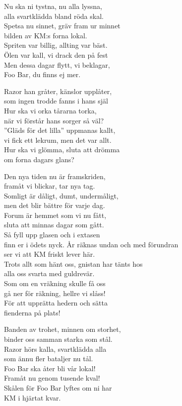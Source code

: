 \songtext{} 
Nu ska ni tystna, nu alla lyssna,\\
alla svartklädda bland röda skal.\\
Spetsa nu sinnet, gräv fram ur minnet\\
bilden av KM:s forna lokal.\\
Spriten var billig, allting var bäst.\\
Ölen var kall, vi drack den på fest\\
Men dessa dagar flytt, vi beklagar,\\
Foo Bar, du finns ej mer.

Razor han gråter, känslor upplåter,\\
som ingen trodde fanns i hans själ\\
Hur ska vi orka tårarna torka,\\
när vi förstår hans sorger så väl?\\
”Gläds för det lilla” uppmanas kallt,\\
vi fick ett lekrum, men det var allt.\\
Hur ska vi glömma, sluta att drömma\\
om forna dagars glans?

Den nya tiden nu är framskriden,\\
framåt vi blickar, tar nya tag.\\
Somligt är dåligt, dumt, undermåligt,\\
men det blir bättre för varje dag.\\
Forum är hemmet som vi nu fått,\\
sluta att minnas dagar som gått.\\
Så fyll upp glasen och i extasen\\
finn er i ödets nyck.
\newpage
År räknas undan och med förundran\\
ser vi att KM friskt lever här.\\
Trots allt som hänt oss, gnistan har tänts hos\\
alla oss svarta med guldrevär.\\
Som om en vräkning skulle få oss\\
gå ner för räkning, hellre vi slåss!\\
För att upprätta hedern och sätta\\
fienderna på plats!

Banden av trohet, minnen om storhet,\\
binder oss samman starka som stål.\\
Razor hörs kalla, svartklädda alla\\
som ännu fler bataljer nu tål.\\
Foo Bar ska åter bli vår lokal!\\
Framåt nu genom tusende kval!\\
Skålen för Foo Bar lyftes om ni har\\
KM i hjärtat kvar.

